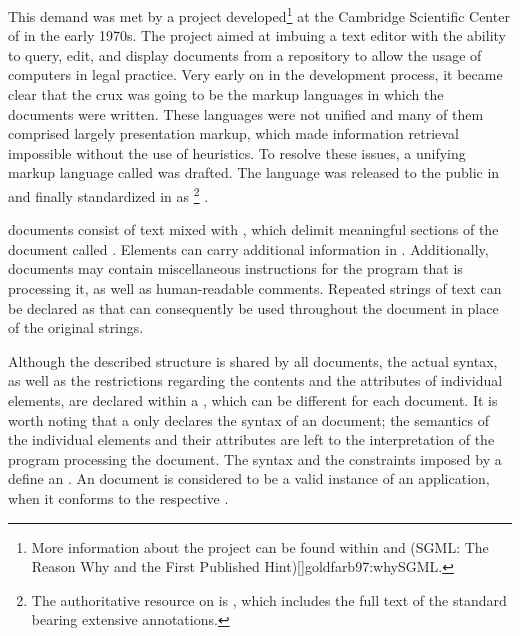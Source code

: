 This demand was met by a project developed\footnote{
  More information about the project can be found within
   and \citework*(SGML: The Reason Why and the First
  Published Hint)[]{goldfarb97:whySGML}.
} at the Cambridge Scientific Center of  in the early 1970s. The
project aimed at imbuing a text editor with the ability to query, edit, and
display documents from a repository to allow the usage of computers in legal
practice. Very early on in the development process, it became clear that the
crux was going to be the markup languages in which the documents were written.
These languages were not unified and many of them comprised largely presentation
markup, which made information retrieval impossible without the use of
heuristics. To resolve these issues, a unifying markup language called
 was drafted. The language was released \cite{goldfarb81}
to the public in \citeyear{goldfarb81} and finally standardized in
\citeyear{iso86} as \footnote{
  The authoritative resource on  is , which
  includes the full text of the standard bearing extensive annotations.
} \cite{iso86}.

 documents consist of text mixed with %
, which delimit meaningful sections of the document called
. Elements can carry additional
information in . Additionally,
 documents may contain miscellaneous instructions for the program
that is processing it, as well as human-readable comments. Repeated strings of
text can be declared as  
that can consequently be used throughout the document in place of the original
strings.

Although the described structure is shared by all  documents, the
actual syntax, as well as the restrictions regarding the contents and the
attributes of individual elements, are declared within a , which
can be different for each document. It is worth noting that a  only
declares the syntax of an  document; the semantics of the
individual elements and their attributes are left to the interpretation of the
program processing the document. The syntax and the constraints imposed by a
 define an %
. An  document is considered to be a
valid instance of an  application, when it conforms to the
respective .

